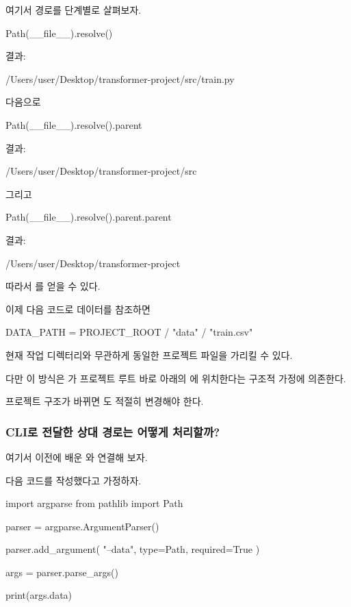 여기서 경로를 단계별로 살펴보자.

\begin{dhkcode}
Path(__file__).resolve()
\end{dhkcode}

결과:

\begin{dhkzsh}
/Users/user/Desktop/transformer-project/src/train.py
\end{dhkzsh}

다음으로

\begin{dhkcode}
Path(__file__).resolve().parent
\end{dhkcode}

결과:

\begin{dhkzsh}
/Users/user/Desktop/transformer-project/src
\end{dhkzsh}

그리고

\begin{dhkcode}
Path(__file__).resolve().parent.parent
\end{dhkcode}

결과:

\begin{dhkzsh}
/Users/user/Desktop/transformer-project
\end{dhkzsh}

따라서 를 얻을 수 있다.

이제 다음 코드로 데이터를 참조하면

\begin{dhkcode}
DATA_PATH = PROJECT_ROOT / "data" / "train.csv"
\end{dhkcode}

현재 작업 디렉터리와 무관하게 동일한 프로젝트 파일을 가리킬 수 있다.

다만 이 방식은 가 프로젝트 루트 바로 아래의 에 위치한다는 구조적 가정에 의존한다.

프로젝트 구조가 바뀌면 도 적절히 변경해야 한다.

\subsubsection{CLI로 전달한 상대 경로는 어떻게 처리할까?}

여기서 이전에 배운 와 연결해 보자.

다음 코드를 작성했다고 가정하자.

\begin{dhkcode}
import argparse
from pathlib import Path

parser = argparse.ArgumentParser()

parser.add_argument(
    "--data",
    type=Path,
    required=True
)

args = parser.parse_args()

print(args.data)
\end{dhkcode}

